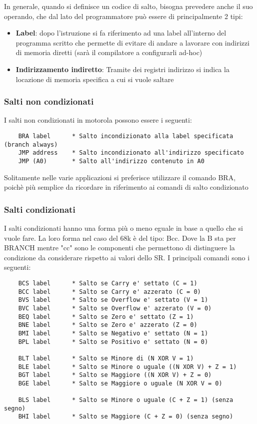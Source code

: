 In generale, quando si definisce un codice di salto, bisogna prevedere anche il suo operando, che dal lato del programmatore può essere di principalmente 2 tipi:
\begin{itemize}
    \item \textbf{Label}: dopo l'istruzione si fa riferimento ad una label all'interno del programma scritto che permette di evitare di andare a lavorare con indirizzi di memoria diretti (sarà il compilatore a configurarli ad-hoc)

    \item \textbf{Indirizzamento indiretto}: Tramite dei registri indirizzo si indica la locazione di memoria specifica a cui si vuole saltare
\end{itemize}

\newpage
\subsubsection{Salti non condizionati}
I salti non condizionati in motorola possono essere i seguenti:
\begin{lstlisting}
    BRA label      * Salto incondizionato alla label specificata (branch always)
    JMP address    * Salto incondizionato all'indirizzo specificato
    JMP (A0)       * Salto all'indirizzo contenuto in A0
\end{lstlisting}

Solitamente nelle varie applicazioni si preferisce utilizzare il comando BRA, poichè più semplice da ricordare in riferimento ai comandi di salto condizionato

\subsubsection{Salti condizionati}
I salti condizionati hanno una forma più o meno eguale in base a quello che si vuole fare. La loro forma nel caso del 68k è del tipo: Bcc. Dove la B sta per BRANCH mentre "cc" sono le componenti che permettono di distinguere la condizione da considerare rispetto ai valori dello SR.
I principali comandi sono i seguenti:
\begin{lstlisting}
    BCS label      * Salto se Carry e' settato (C = 1)
    BCC label      * Salto se Carry e' azzerato (C = 0)
    BVS label      * Salto se Overflow e' settato (V = 1)
    BVC label      * Salto se Overflow e' azzerato (V = 0)
    BEQ label      * Salto se Zero e' settato (Z = 1)
    BNE label      * Salto se Zero e' azzerato (Z = 0)
    BMI label      * Salto se Negativo e' settato (N = 1)
    BPL label      * Salto se Positivo e' settato (N = 0)

    BLT label      * Salto se Minore di (N XOR V = 1)
    BLE label      * Salto se Minore o uguale ((N XOR V) + Z = 1)
    BGT label      * Salto se Maggiore ((N XOR V) + Z = 0)
    BGE label      * Salto se Maggiore o uguale (N XOR V = 0)

    BLS label      * Salto se Minore o uguale (C + Z = 1) (senza segno)
    BHI label      * Salto se Maggiore (C + Z = 0) (senza segno)
\end{lstlisting}

